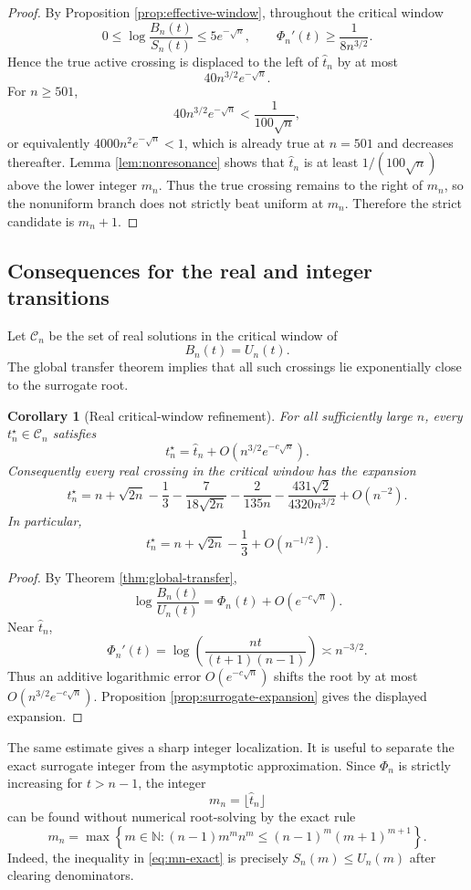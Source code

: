 \documentclass[11pt]{article}
\newtheorem{corollary}[theorem]{Corollary}
\theoremstyle{definition}
\begin{document}
\begin{proof}
By Proposition \ref{prop:effective-window}, throughout the critical window
\[
  0\le \log\frac{B_n(t)}{S_n(t)}\le5e^{-\sqrt n},
  \qquad
  \Phi_n'(t)\ge \frac{1}{8n^{3/2}}.
\]
Hence the true active crossing is displaced to the left of \(\widehat t_n\) by at most
\[
  40n^{3/2}e^{-\sqrt n}.
\]
For \(n\ge501\),
\[
  40n^{3/2}e^{-\sqrt n}<\frac{1}{100\sqrt n},
\]
or equivalently \(4000n^2e^{-\sqrt n}<1\), which is already true at \(n=501\) and decreases thereafter.  Lemma \ref{lem:nonresonance} shows that \(\widehat t_n\) is at least \(1/(100\sqrt n)\) above the lower integer \(m_n\).  Thus the true crossing remains to the right of \(m_n\), so the nonuniform branch does not strictly beat uniform at \(m_n\).  Therefore the strict candidate is \(m_n+1\).
\end{proof}

\subsection{Consequences for the real and integer transitions}

Let $\mathcal C_n$ be the set of real solutions in the critical window of
\[
  B_n(t)=U_n(t).
\]
The global transfer theorem implies that all such crossings lie exponentially close to the surrogate root.

\begin{corollary}[Real critical-window refinement]\label{cor:real-critical}
For all sufficiently large $n$, every $t_n^\star\in\mathcal C_n$ satisfies
\[
  t_n^\star=\widehat t_n+O(n^{3/2}e^{-c\sqrt n}).
\]
Consequently every real crossing in the critical window has the expansion
\[
  t_n^\star
  =n+\sqrt{2n}-\frac13-\frac{7}{18\sqrt{2n}}-\frac{2}{135n}
  -\frac{431\sqrt2}{4320n^{3/2}}+O(n^{-2}).
\]
In particular,
\[
  t_n^\star=n+\sqrt{2n}-\frac13+O(n^{-1/2}).
\]
\end{corollary}

\begin{proof}
By Theorem \ref{thm:global-transfer},
\[
  \log\frac{B_n(t)}{U_n(t)}=\Phi_n(t)+O(e^{-c\sqrt n}).
\]
Near $\widehat t_n$,
\[
  \Phi_n'(t)=\log\left(\frac{nt}{(t+1)(n-1)}\right)\asymp n^{-3/2}.
\]
Thus an additive logarithmic error $O(e^{-c\sqrt n})$ shifts the root by at most $O(n^{3/2}e^{-c\sqrt n})$. Proposition \ref{prop:surrogate-expansion} gives the displayed expansion.
\end{proof}

The same estimate gives a sharp integer localization.  It is useful to separate the exact surrogate integer from the asymptotic approximation.  Since $\Phi_n$ is strictly increasing for $t>n-1$, the integer
\begin{equation}\label{eq:mn-def}
  m_n=\lfloor \widehat t_n\rfloor
\end{equation}
can be found without numerical root-solving by the exact rule
\begin{equation}\label{eq:mn-exact}
  m_n=\max\left\{m\in\mathbb N:
  (n-1)m^m n^m \le (n-1)^m(m+1)^{m+1}\right\}.
\end{equation}
Indeed, the inequality in \eqref{eq:mn-exact} is precisely $S_n(m)\le U_n(m)$ after clearing denominators.
\end{document}
